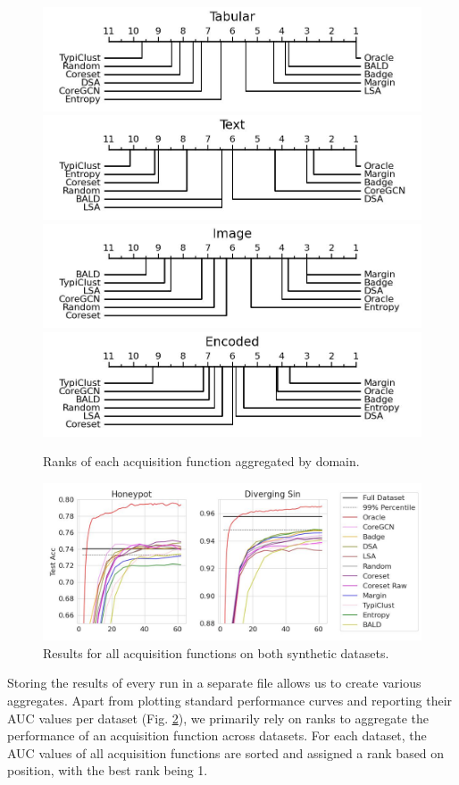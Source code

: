 \documentclass[]{article}
\begin{document}
%
\begin{figure}
    \centering
    \caption{Ranks of each acquisition function aggregated by domain.}
    \label{fig:ranks_by_domain}
    \includegraphics[width=0.49\linewidth]{img/macro_vector.jpg}
    \includegraphics[width=0.49\linewidth]{img/macro_text.jpg}
    \includegraphics[width=0.49\linewidth]{img/macro_img.jpg}
    \includegraphics[width=0.49\linewidth]{img/macro_enc.jpg}
\end{figure}
%
\begin{figure}
    \centering
    \caption{Results for all acquisition functions on both synthetic datasets.}
    \label{fig:main_body_result}
    \includegraphics[width=0.9\linewidth]{img/synth_trajectories.jpg}
\end{figure}
Storing the results of every run in a separate file allows us to create various aggregates.
Apart from plotting standard performance curves and reporting their AUC values per dataset (Fig. \ref{fig:main_body_result}), we primarily rely on ranks to aggregate the performance of an acquisition function across datasets.
For each dataset, the AUC values of all acquisition functions are sorted and assigned a rank based on position, with the best rank being 1.
\end{document}
